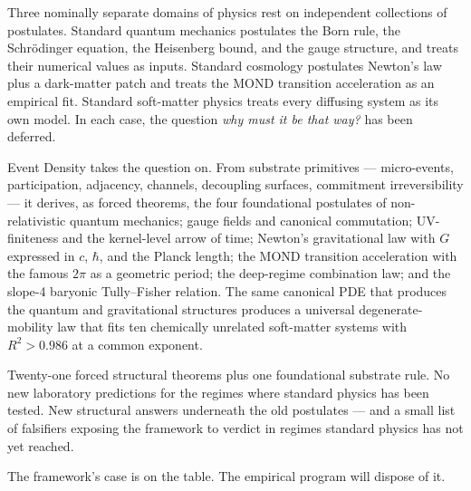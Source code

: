 \documentclass[11pt,a4paper]{article}
\begin{document}
Three nominally separate domains of physics rest on independent collections of postulates. Standard quantum mechanics postulates the Born rule, the Schr\"odinger equation, the Heisenberg bound, and the gauge structure, and treats their numerical values as inputs. Standard cosmology postulates Newton's law plus a dark-matter patch and treats the MOND transition acceleration as an empirical fit. Standard soft-matter physics treats every diffusing system as its own model. In each case, the question \emph{why must it be that way?} has been deferred.

Event Density takes the question on. From substrate primitives --- micro-events, participation, adjacency, channels, decoupling surfaces, commitment irreversibility --- it derives, as forced theorems, the four foundational postulates of non-relativistic quantum mechanics; gauge fields and canonical commutation; UV-finiteness and the kernel-level arrow of time; Newton's gravitational law with $G$ expressed in $c$, $\hbar$, and the Planck length; the MOND transition acceleration with the famous $2\pi$ as a geometric period; the deep-regime combination law; and the slope-4 baryonic Tully--Fisher relation. The same canonical PDE that produces the quantum and gravitational structures produces a universal degenerate-mobility law that fits ten chemically unrelated soft-matter systems with $R^2 > 0.986$ at a common exponent.

Twenty-one forced structural theorems plus one foundational substrate rule. No new laboratory predictions for the regimes where standard physics has been tested. New structural answers underneath the old postulates --- and a small list of falsifiers exposing the framework to verdict in regimes standard physics has not yet reached.

The framework's case is on the table. The empirical program will dispose of it.
\end{document}
